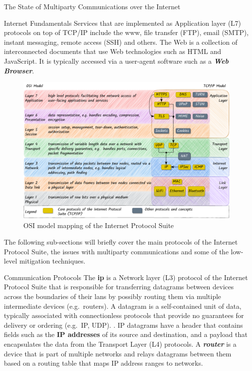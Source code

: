 \begin{frame}[fragile]{The State of Multiparty Communications over the
Internet}
\begin{block}{Internet Fundamentals}
Services that are implemented as Application layer (L7) protocols on top
of TCP/IP include the \gls{www}, file transfer (FTP), email (SMTP),
instant messaging, remote access (SSH\autocite{sshRFC}) and others. The
Web is a collection of interconnected documents that use Web
technologies such as HTML and JavaScript. It is typically accessed via a
user-agent software such as a \textbf{\emph{Web Browser}}.

\begin{figure}
\centering
\includegraphics[width=1\textwidth,height=\textheight]{thesis/../figures/osi-map-tcp.drawio.pdf}
\caption{OSI model mapping of the Internet Protocol
Suite\label{osi-map-tcp}}
\end{figure}

The following sub-sections will briefly cover the main protocols of the
Internet Protocol Suite, the issues with multiparty communications and
some of the low-level mitigation techniques.


\begin{block}{Communication Protocols}
\protect\hypertarget{communication-protocols}{}
The \textbf{\acrfull{ip}} \autocite{ipv4RFC} is a Network layer (L3)
protocol of the Internet Protocol Suite that is responsible for
transferring datagrams between devices across the boundaries of their
\glspl{lan} by possibly routing them via multiple intermediate devices
(e.g.~routers). A datagram is a self-contained unit of data, typically
associated with connectionless protocols that provide no guarantees for
delivery or ordering (e.g.~IP, UDP).
. IP datagrams
have a header that contains fields such as the \textbf{IP addresses} of
its source and destination, and a
payload that encapsulates the data from the Transport Layer (L4)
protocols. A \textbf{\emph{router}} is a device that is part of multiple
networks and relays datagrams between them based on a routing table that
maps IP address ranges to networks.


\end{block}
\end{block}
\end{frame}
